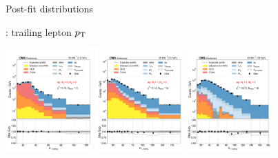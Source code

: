 \begin{frame}{}
Post-fit distributions
    \begin{tcolorbox}[colframe=NUpurple]{ \cem: trailing lepton $p_{\mathrm{T}}$}
        \begin{center}
            \includegraphics[width=0.25\textwidth]{chapters/Analysis/sectionStatisticalAnalysis/figures/fit/emu_cat_eq0_eq0_a}
            \includegraphics[width=0.25\textwidth]{chapters/Analysis/sectionStatisticalAnalysis/figures/fit/emu_cat_eq1_eq0_a}
            \includegraphics[width=0.25\textwidth]{chapters/Analysis/sectionStatisticalAnalysis/figures/fit/emu_cat_eq1_eq1_a}


\end{center}
\end{tcolorbox}
\end{frame}
